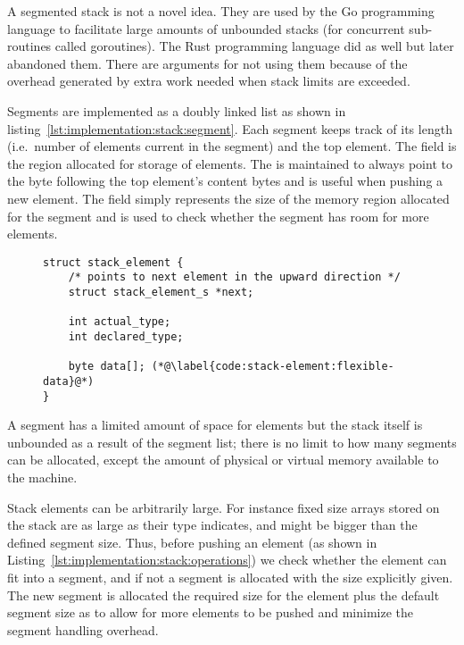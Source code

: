 \begin{remark}
  A segmented stack is not a novel idea. They are used by the Go programming
  language to facilitate large amounts of unbounded stacks (for concurrent
  sub-routines called goroutines). The Rust programming language did as well but
  later abandoned them. There are arguments for not using them because of the
  overhead generated by extra work needed when stack limits are
  exceeded\cite{rust:segmented-stack, go:segmented-stack}.
\end{remark}

Segments are implemented as a doubly linked list as shown in
listing~\ref{lst:implementation:stack:segment}. Each segment keeps track of its
length (i.e.~number of elements current in the segment) and the top element. The
 field is the region allocated for storage of elements. The
 is maintained to always point to the byte following the top
element's content bytes and is useful when pushing a new element. The
 field simply represents the size of the memory region allocated for
the segment and is used to check whether the segment has room for more elements.

\begin{figure}[h]
  \centering
  \begin{lstlisting}[language={[ANSI]C},%
    caption={Structure defining the stack},%
    label={lst:implementation:stack:element}]
struct stack_element {
    /* points to next element in the upward direction */
    struct stack_element_s *next;

    int actual_type;
    int declared_type;

    byte data[]; (*@\label{code:stack-element:flexible-data}@*)
}
  \end{lstlisting}
\end{figure}

A segment has a limited amount of space for elements but the stack itself is
unbounded as a result of the segment list; there is no limit to how many
segments can be allocated, except the amount of physical or virtual memory
available to the machine.

Stack elements can be arbitrarily large. For instance fixed size arrays stored
on the stack are as large as their type indicates, and might be bigger than the
defined segment size. Thus, before pushing an element (as shown in
Listing~\ref{lst:implementation:stack:operations}) we check whether the element
can fit into a segment, and if not a segment is allocated with the size
explicitly given. The new segment is allocated the required size for the element
plus the default segment size as to allow for more elements to be pushed and
minimize the segment handling overhead.

